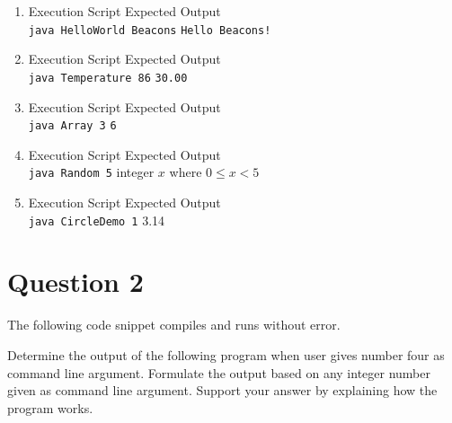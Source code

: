 \documentclass[12pt,letterpaper,twoside]{article}
\begin{document}
\begin{enumerate}[label=\textbf{(\alph*)}]

\item Execution Script \hfill Expected Output\\
\texttt{java HelloWorld Beacons} \hfill \texttt{Hello Beacons!}


\item Execution Script \hfill Expected Output\\
\texttt{java Temperature 86} \hfill \texttt{30.00}


\newpage

\item Execution Script \hfill Expected Output\\
\texttt{java Array 3} \hfill \texttt{6}


\item Execution Script \hfill Expected Output\\
\texttt{java Random 5} \hfill integer $x$ where $0 \leq x < 5$


\newpage

\item Execution Script \hfill Expected Output\\
\texttt{java CircleDemo 1} \hfill 3.14



\end{enumerate}

\newpage

\section*{Question 2}

The following code snippet compiles and runs without error.

Determine the output of the following program when user gives number four as command line argument.
Formulate the output based on any integer number given as command line argument.
Support your answer by explaining how the program works.


\end{document}
